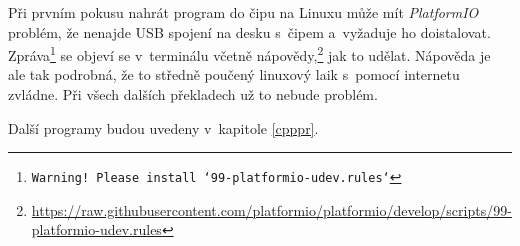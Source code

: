 Při prvním pokusu nahrát program do čipu na Linuxu může mít {\it PlatformIO} problém, že nenajde USB spojení na desku s~čipem a~vyžaduje ho doistalovat. 
Zpráva\footnote{\tt Warning! Please install `99-platformio-udev.rules`} se objeví se v~terminálu včetně nápovědy,\footnote{\url{https://raw.githubusercontent.com/platformio/platformio/develop/scripts/99-platformio-udev.rules}} jak to udělat.
Nápověda je ale tak podrobná, že to středně poučený linuxový laik s~pomocí internetu zvládne.
Při všech dalších překladech už to nebude problém.  

Další programy budou uvedeny v~kapitole \ref{cpppr}. 

